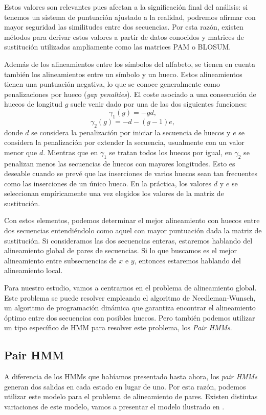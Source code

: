 Estos valores son relevantes pues afectan a la significación final del análisis: si tenemos un sistema de puntuación ajustado a la realidad, podremos afirmar con mayor seguridad las similitudes entre dos secuencias. Por esta razón, existen métodos para derivar estos valores a partir de datos conocidos y matrices de sustitución utilizadas ampliamente como las matrices PAM o BLOSUM.

Además de los alineamientos entre los símbolos del alfabeto, se tienen en cuenta también los alineamientos entre un símbolo y un hueco. Estos alineamientos tienen una puntuación negativa, lo que se conoce generalmente como penalizaciones por hueco (\textit{gap penalties}). El coste asociado a una consecución de huecos de longitud $g$ suele venir dado por una de las dos siguientes funciones:
\[\gamma_1(g)=-gd,\]
\[\gamma_2(g)=-d-(g-1)e,\]
donde $d$ se considera la penalización por iniciar la secuencia de huecos y $e$ se considera la penalización por extender la secuencia, usualmente con un valor menor que $d$. Mientras que en $\gamma_1$ se tratan todos los huecos por igual, en $\gamma_2$ se penalizan menos las secuencias de huecos con mayores longitudes. Esto es deseable cuando se prevé que las inserciones de varios huecos sean tan frecuentes como las inserciones de un único hueco. En la práctica, los valores $d$ y $e$ se seleccionan empíricamente una vez elegidos los valores de la matriz de sustitución.

Con estos elementos, podemos determinar el mejor alineamiento con huecos entre dos secuencias entendiéndolo como aquel con mayor puntuación dada la matriz de sustitución. Si consideramos las dos secuencias enteras, estaremos hablando del alineamiento global de pares de secuencias. Si lo que buscamos es el mejor alineamiento entre subsecuencias de $x$ e $y$, entonces estaremos hablando del alineamiento local.

Para nuestro estudio, vamos a centrarnos en el problema de alineamiento global. Este problema se puede resolver empleando el algoritmo de Needleman-Wunsch, un algoritmo de programación dinámica que garantiza encontrar el alineamiento óptimo entre dos secuencias con posibles huecos. Pero también podemos utilizar un tipo específico de HMM para resolver este problema, los \textit{Pair HMMs}.

\subsection{Pair HMM}
A diferencia de los HMMs que habíamos presentado hasta ahora, los \textit{pair HMMs} generan dos salidas en cada estado en lugar de uno. Por esta razón, podemos utilizar este modelo para el problema de alineamiento de pares. Existen distintas variaciones de este modelo, vamos a presentar el modelo ilustrado en \cite{Durbin}. 

